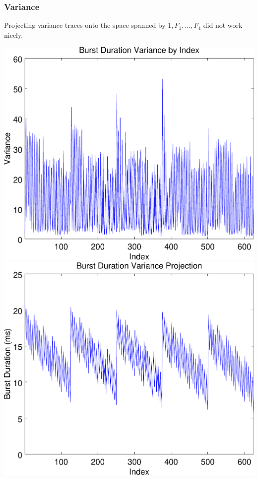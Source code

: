\documentclass{beamer}
\theoremstyle{plain}
\theoremstyle{definition}
\begin{document}
\begin{frame}\frametitle{Variance}
  Projecting variance traces onto the space spanned by $1,F_1,...,F_4$ did not work nicely.
  \begin{center}
    \includegraphics[scale=.32]{BurstDurationVariance.pdf}%
    \includegraphics[scale=.32]{BurstDurationVarianceProjection.pdf}%
  \end{center}
\end{frame}
\end{document}
